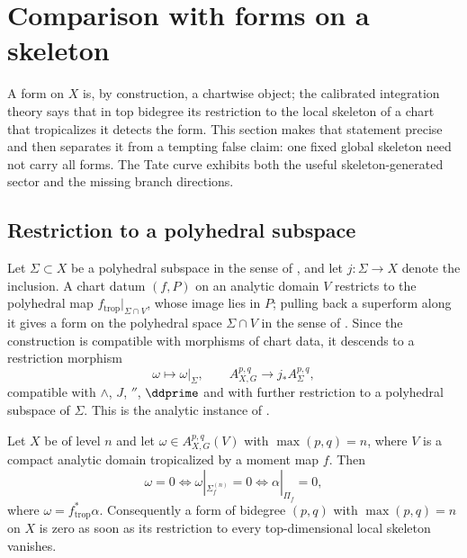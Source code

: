 \section{Comparison with forms on a skeleton}
\label{sec:ch13-skeleton}

A form on $X$ is, by construction, a chartwise object; the calibrated
integration theory says that in top bidegree its restriction to the local
skeleton of a chart that tropicalizes it detects the form.  This section
makes that statement precise and then separates it from a tempting false
claim: one fixed global skeleton need not carry all forms.  The Tate curve
exhibits both the useful skeleton-generated sector and the missing branch
directions.

\subsection{Restriction to a polyhedral subspace}

Let $\Sigma\subset X$ be a polyhedral subspace in the sense of
, and let $j:\Sigma\to X$ denote the
inclusion.  A chart datum $(f,P)$ on an analytic domain $V$ restricts to the
polyhedral map $f_{\mathrm{trop}}|_{\Sigma\cap V}$, whose image lies in $P$;
pulling back a superform along it gives a form on the polyhedral space
$\Sigma\cap V$ in the sense of .  Since the
construction is compatible with morphisms of chart data, it descends to a
restriction morphism
\[
 \omega\longmapsto\omega|_\Sigma,
 \qquad
 A^{p,q}_{X,G}\longrightarrow j_*A^{p,q}_\Sigma ,
\]
compatible with $\wedge$, $J$, $\dprime$, $\ddprime$ and with further
restriction to a polyhedral subspace of $\Sigma$.  This is the analytic
instance of \cite[\S3.3.13]{CLD25}.

\begin{proposition}
\label{prop:ch13-skeletal-faithful}
Let $X$ be of level $n$ and let $\omega\in A^{p,q}_{X,G}(V)$ with
$\max(p,q)=n$, where $V$ is a compact analytic domain tropicalized by a
moment map $f$.  Then
\[
 \omega=0
 \iff
 \omega|_{\Sigma_f^{(n)}}=0
 \iff
 \alpha|_{\Pi_f}=0,
\]
where $\omega=f_{\mathrm{trop}}^*\alpha$.  Consequently a form of bidegree $(p,q)$ with $\max(p,q)=n$ on $X$ is zero as
soon as its restriction to every top-dimensional local skeleton vanishes.
\end{proposition}

